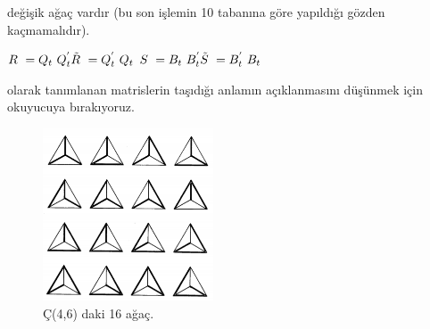 \documentclass[11pt]{amsbook}
\begin{document}

değişik ağaç vardır (bu son işlemin 10 tabanına göre yapıldığı gözden kaçmamalıdır).

\begin{multicols}{2}
	
		$R~=Q_{t}~Q_{t}^{'}\\
		\tilde{R}~=Q_{t}^{'}~Q_{t}$\vfill
		\columnbreak$ S~=B_{t}~B_{t}^{'}\\
		\tilde{S}~=B_{t}^{'}~B_{t}$
\end{multicols}

olarak tanımlanan matrislerin taşıdığı anlamın açıklanmasını düşünmek için okuyucuya bırakıyoruz.

\begin{figure}[htb]
	\centering
	\includegraphics[width=0.45\textwidth]{images/ceyhun-146-fig01}
	\caption{Ç(4,6) daki 16 ağaç.}
	\label{fig:ceyhun-146-fig01}
\end{figure}
\end{document}
